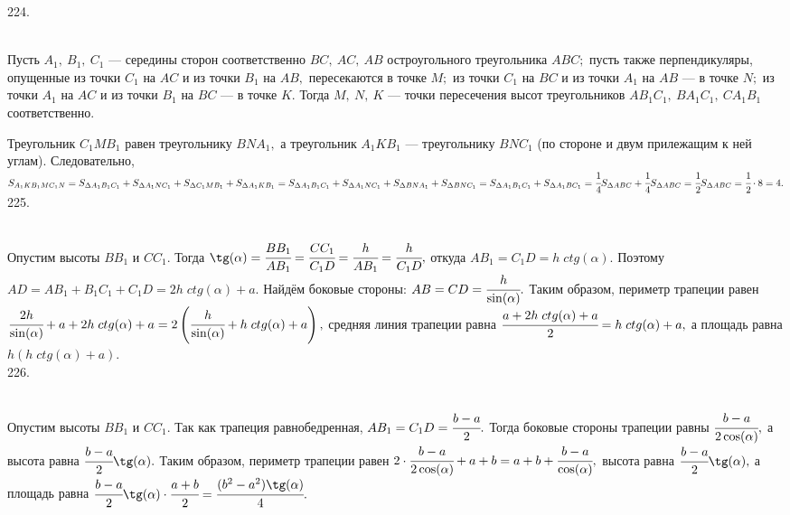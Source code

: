 224. \begin{figure}[ht!]
\end{figure}\\
Пусть $A_1,\ B_1,\ C_1$ --- середины сторон соответственно $BC,\ AC,\ AB$ остроугольного треугольника $ABC;$ пусть также перпендикуляры, опущенные из точки $C_1$ на $AC$ и из точки $B_1$ на $AB,$ пересекаются в точке $M;$ из точки $C_1$ на $BC$ и из точки $A_1$ на $AB$ --- в точке $N;$ из точки $A_1$ на $AC$ и из точки $B_1$ на $BC$ --- в точке $K.$ Тогда $M,\ N,\ K$ --- точки пересечения высот треугольников $AB_1C_1,\ BA_1C_1,\ CA_1B_1$ соответственно.

Треугольник $C_1MB_1$ равен треугольнику $BNA_1,$ а треугольник $A_1KB_1$ --- треугольнику $BNC_1$ (по стороне и двум прилежащим к ней углам). Следовательно,
$S_{A_1KB_1MC_1N} = S_{\Delta A_1B_1C_1} + S_{\Delta A_1NC_1} + S_{\Delta C_1MB_1} + S_{\Delta A_1KB_1}
= S_{\Delta A_1B_1C_1} + S_{\Delta A_1NC_1} + S_{\Delta BNA_1} + S_{\Delta BNC_1}
= S_{\Delta A_1B_1C_1} + S_{\Delta A_1BC_1} = \cfrac{1}{4}S_{\Delta ABC} + \cfrac{1}{4}S_{\Delta ABC} = \cfrac{1}{2}S_{\Delta ABC}=\cfrac{1}{2}\cdot 8=4.$\\
225. \begin{figure}[ht!]
\end{figure}\\
Опустим высоты $BB_1$ и $CC_1.$ Тогда $\tg(\alpha)=\cfrac{BB_1}{AB_1}=\cfrac{CC_1}{C_1D}=\cfrac{h}{AB_1}=\cfrac{h}{C_1D},$ откуда $AB_1=C_1D=h\; ctg(\alpha).$ Поэтому $AD=AB_1+B_1C_1+C_1D=2h\; ctg(\alpha)+a.$ Найдём боковые стороны: $AB=CD=\cfrac{h}{\sin(\alpha)}.$ Таким образом, периметр трапеции равен $\cfrac{2h}{\sin(\alpha)}+a+2h\; ctg(\alpha)+a=2\left(\cfrac{h}{\sin(\alpha)}+h\; ctg(\alpha)+a\right),$ средняя линия трапеции равна $\cfrac{a+2h\; ctg(\alpha)+a}{2}=h\; ctg(\alpha)+a,$ а площадь равна $h(h\; ctg(\alpha)+a).$\\
226. \begin{figure}[ht!]
\end{figure}\\
Опустим высоты $BB_1$ и $CC_1.$ Так как трапеция равнобедренная, $AB_1=C_1D=\cfrac{b-a}{2}.$ Тогда боковые стороны трапеции равны $\cfrac{b-a}{2\cos(\alpha)},$
а высота равна $\cfrac{b-a}{2}\tg(\alpha).$ Таким образом, периметр трапеции равен $2\cdot\cfrac{b-a}{2\cos(\alpha)}+a+b=a+b+\cfrac{b-a}{\cos(\alpha)},$ высота равна $\cfrac{b-a}{2}\tg(\alpha),$ а площадь равна $\cfrac{b-a}{2}\tg(\alpha)\cdot\cfrac{a+b}{2}=\cfrac{(b^2-a^2)\tg(\alpha)}{4}.$\\
